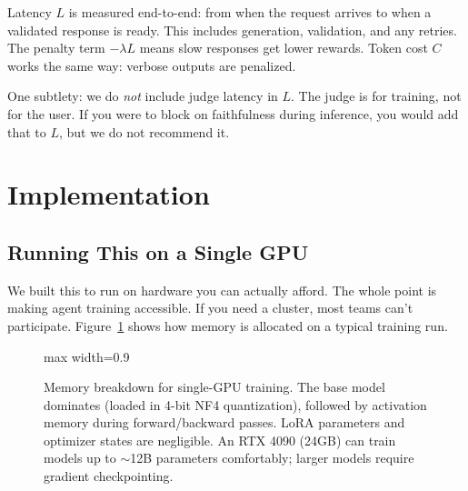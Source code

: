 \documentclass[11pt]{article}
\begin{document}
Latency $L$ is measured end-to-end: from when the request arrives to when a validated response is ready.
This includes generation, validation, and any retries.
The penalty term $-\lambda L$ means slow responses get lower rewards.
Token cost $C$ works the same way: verbose outputs are penalized.

One subtlety: we do \emph{not} include judge latency in $L$.
The judge is for training, not for the user.
If you were to block on faithfulness during inference, you would add that to $L$, but we do not recommend it.

\section{Implementation}
\label{sec:implementation}

\subsection{Running This on a Single GPU}

We built this to run on hardware you can actually afford.
The whole point is making agent training accessible.  If you need a cluster, most teams can't participate.
Figure~\ref{fig:memory-breakdown} shows how memory is allocated on a typical training run.

\begin{figure}[t]
\centering
\begin{adjustbox}{max width=0.9\linewidth}
\end{adjustbox}
\caption{Memory breakdown for single-GPU training.
The base model dominates (loaded in 4-bit NF4 quantization), followed by activation memory during forward/backward passes.
LoRA parameters and optimizer states are negligible.
An RTX 4090 (24GB) can train models up to $\sim$12B parameters comfortably; larger models require gradient checkpointing.}
\label{fig:memory-breakdown}
\end{figure}
\end{document}
